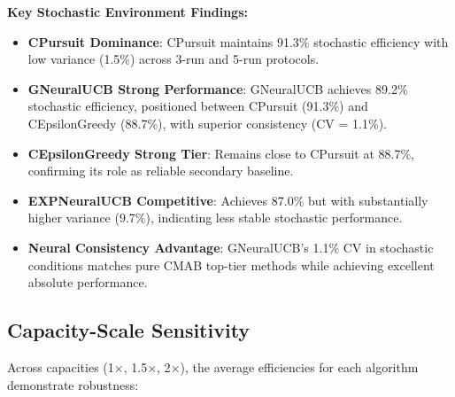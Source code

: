\documentclass[12pt,a4paper]{article}
\newcommand{\performance}[1]{\textcolor{performancecolor}{\textbf{#1}}}
\newcommand{\stochastic}[1]{\textcolor{stochasticcolor}{\textbf{#1}}}
\newcommand{\legacy}[1]{\textcolor{legacycolor}{\textbf{#1}}}
\newcommand{\neural}[1]{\textcolor{neuralcolor}{\textbf{#1}}}
\begin{document}
\begin{tcolorbox}[colback=stochasticcolor!10,colframe=stochasticcolor,title=\textbf{Stochastic Environment Deep Analysis (1$\times$–2$\times$ Capacities, T/Tb Combined, 3-run/5-run)}]
\textbf{Key Stochastic Environment Findings:}
\begin{itemize}
\item \stochastic{CPursuit Dominance}: CPursuit maintains 91.3\% stochastic efficiency with low variance (1.5\%) across 3-run and 5-run protocols.
\item \neural{GNeuralUCB Strong Performance}: GNeuralUCB achieves 89.2\% stochastic efficiency, positioned between CPursuit (91.3\%) and CEpsilonGreedy (88.7\%), with superior consistency (CV = 1.1\%).
\item \performance{CEpsilonGreedy Strong Tier}: Remains close to CPursuit at 88.7\%, confirming its role as reliable secondary baseline.
\item \legacy{EXPNeuralUCB Competitive}: Achieves 87.0\% but with substantially higher variance (9.7\%), indicating less stable stochastic performance.
\item \neural{Neural Consistency Advantage}: GNeuralUCB's 1.1\% CV in stochastic conditions matches pure CMAB top-tier methods while achieving excellent absolute performance.
\end{itemize}

\end{tcolorbox}

\subsection{Capacity-Scale Sensitivity}

Across capacities (1$\times$, 1.5$\times$, 2$\times$), the average efficiencies for each algorithm demonstrate robustness:
\end{document}
